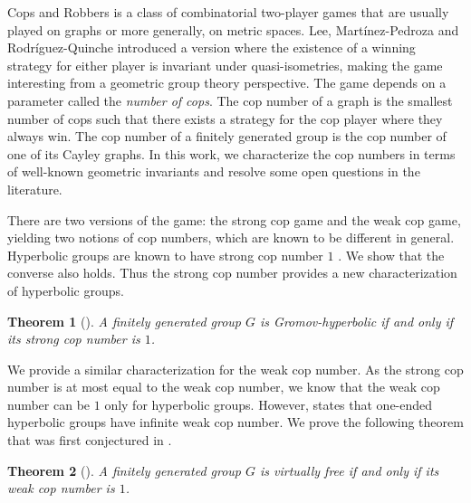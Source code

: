 \documentclass{amsart}
\newtheorem{theoremA}{Theorem}[section]
\theoremstyle{definition}
\theoremstyle{remark}
\theoremstyle{remark}
\theoremstyle{definition}
\begin{document}
Cops and Robbers is a class of combinatorial two-player games that are usually played on graphs or more generally, on metric spaces. Lee, Mart\'inez-Pedroza and Rodr\'iguez-Quinche \cite{LMR23} introduced a version where the existence of a winning strategy for either player is invariant under quasi-isometries, making the game interesting from a geometric group theory perspective. The game depends on a parameter called the \emph{number of cops}. The cop number of a graph is the smallest number of cops such that there exists a strategy for the cop player where they always win. The cop number of a finitely generated group is the cop number of one of its Cayley graphs.
In this work, we characterize the cop numbers in terms of well-known geometric invariants and resolve some open questions in the literature.

There are two versions of the game: the strong cop game and the weak cop game, yielding two notions of cop numbers, which are known to be different in general. Hyperbolic groups are known to have strong cop number \(1\) \cite[Theorem A]{LMR23}. We show that the converse also holds. Thus the strong cop number provides a new characterization of hyperbolic groups.
\begin{theoremA}[]\label{thmA:scop-hyperbolic}
	A finitely generated group \(G\) is Gromov-hyperbolic if and only if its strong cop number is \(1\).
\end{theoremA}

We provide a similar characterization for the weak cop number. As the strong cop number is at most equal to the weak cop number, we know that the weak cop number can be $1$ only for hyperbolic groups.
However, \cite[Corollary J]{LMR23} states that one-ended hyperbolic groups have infinite weak cop number.
We prove the following theorem that was first conjectured in \cite[Question 1.4]{CoMa24arxiv}.
\begin{theoremA}[]\label{thmA:wcop-virtfree}
	A finitely generated group $G$ is virtually free if and only if its weak cop number is $1$.
\end{theoremA}
\end{document}
